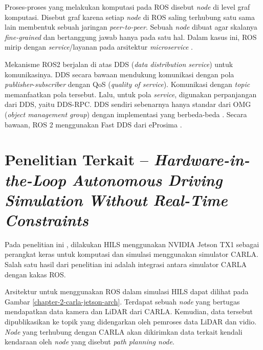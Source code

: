 Proses-proses yang melakukan komputasi pada ROS disebut \textit{node} di level
graf komputasi. Disebut graf karena setiap \textit{node} di ROS saling terhubung
satu sama lain membentuk sebuah jaringan \textit{peer-to-peer}. Sebuah
\textit{node} dibuat agar skalanya \textit{fine-grained} dan bertanggung jawab
hanya pada satu hal. Dalam kasus ini, ROS mirip dengan \textit{service}/layanan
pada arsitektur \textit{microservice} \parencite{x_rosConcepts}.

Mekanisme ROS2 berjalan di atas DDS (\textit{data distribution service}) untuk
komunikasinya. DDS secara bawaan mendukung komunikasi dengan pola
\textit{publisher}-\textit{subscriber} dengan QoS (\textit{quality of service}).
Komunikasi dengan \textit{topic} memanfaatkan pola tersebut. Lalu, untuk pola
\textit{service}, digunakan perpanjangan dari DDS, yaitu DDS-RPC. DDS sendiri
sebenarnya hanya standar dari OMG (\textit{object management group}) dengan
implementasi yang berbeda-beda \parencite{doi:10.1126/scirobotics.abm6074_ros}.
Secara bawaan, ROS 2 menggunakan Fast DDS dari eProsima
\parencite{x_rosRollingDifferentMiddlewareVendors}.

\section{Penelitian Terkait -- \textit{Hardware-in-the-Loop Autonomous Driving Simulation Without
	  Real-Time Constraints}}\label{chapter-2-section-related-works}

Pada penelitian ini \parencite{brogle_CarlaHILS}, dilakukan HILS menggunakan
NVIDIA Jetson TX1 sebagai perangkat keras untuk komputasi dan simulasi
menggunakan simulator CARLA. Salah satu hasil dari penelitian ini adalah
integrasi antara simulator CARLA dengan kakas ROS.

Arsitektur untuk menggunakan ROS dalam simulasi HILS dapat dilihat pada Gambar
\ref{chapter-2-carla-jetson-arch}. Terdapat sebuah \textit{node}  yang
bertugas mendapatkan data kamera dan LiDAR dari CARLA. Kemudian, data tersebut
dipublikasikan ke topik yang didengarkan oleh pemroses data LiDAR dan vidio.
\textit{Node} yang terhubung dengan CARLA akan dikirimkan data terkait kendali
kendaraan oleh \textit{node} yang disebut \textit{path planning node}.

